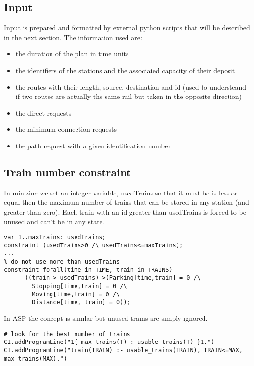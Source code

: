 \documentclass[11pt]{article}
\begin{document}
\subsection{Input}

Input is prepared and formatted by external python scripts that will be described
in the next section. The information used are:
\begin{itemize}
\item the duration of the plan in time units 
\item the identifiers of the stations and the associated capacity of their deposit
\item the routes with their length, source, destination and id (used to understeand if two routes are actually the same rail but taken in the opposite direction)
\item the direct requests
\item the minimum connection requests
\item the path request with a given identification number 
\end{itemize}

\subsection{Train number constraint}

In minizinc we set an integer variable, usedTrains so that it must be 
is less or equal then the maximum number of trains that can
be stored in any station (and greater than zero).
Each train with an id greater than usedTrains is forced 
to be unused and can't be in any state.

\begin{verbatim}
var 1..maxTrains: usedTrains;
constraint (usedTrains>0 /\ usedTrains<=maxTrains);
...
% do not use more than usedTrains 
constraint forall(time in TIME, train in TRAINS)
      ((train > usedTrains)->(Parking[time,train] = 0 /\
        Stopping[time,train] = 0 /\
        Moving[time,train] = 0 /\ 
        Distance[time, train] = 0));
\end{verbatim}

In ASP the concept is similar but unused trains are simply ignored.

\begin{verbatim}
# look for the best number of trains
CI.addProgramLine("1{ max_trains(T) : usable_trains(T) }1.")
CI.addProgramLine("train(TRAIN) :- usable_trains(TRAIN), TRAIN<=MAX, max_trains(MAX).")
\end{verbatim}
\end{document}
